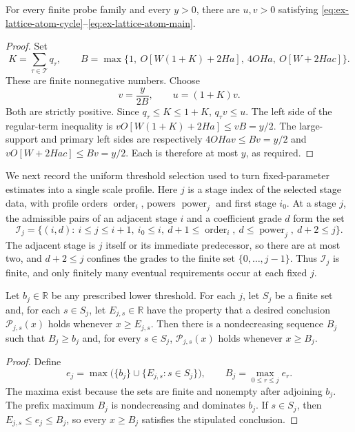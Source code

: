 \begin{lemma}
\label{lem:ex-lattice-local-budget-choice}
For every finite probe family and every \(y>0\), there are \(u,v>0\)
satisfying \eqref{eq:ex-lattice-atom-cycle}--\eqref{eq:ex-lattice-atom-main}.
\end{lemma}
\begin{proof}
Set
\[
 K=\sum_{\tau\in\mathcal T}q_\tau,\qquad
 B=\max\{1,\ O[W(1+K)+2Ha],\ 4OHa,\ O[W+2Hac]\}.
\]
These are finite nonnegative numbers. Choose
\[
 v=\frac{y}{2B},\qquad u=(1+K)v.
\]
Both are strictly positive. Since \(q_\tau\leq K\leq1+K\),
\(q_\tau v\leq u\). The left side of the regular-term inequality is
\(vO[W(1+K)+2Ha]\leq vB=y/2\). The large-support and primary left
sides are respectively \(4OHav\leq Bv=y/2\) and
\(vO[W+2Hac]\leq Bv=y/2\). Each is therefore at most \(y\), as
required.
\end{proof}

We next record the uniform threshold selection used to turn fixed-parameter
estimates into a single scale profile. Here \(j\) is a stage index of the
selected stage data, with profile orders \(\operatorname{order}_i\),
powers \(\operatorname{power}_j\) and first stage \(i_0\). At a stage
\(j\), the admissible pairs of an adjacent stage \(i\) and a coefficient
grade \(d\) form the set
\[
 \mathcal I_j=\bigl\{(i,d):\ i\leq j\leq i+1,\ i_0\leq i,\
   d+1\leq\operatorname{order}_i,\ d\leq\operatorname{power}_j,\
   d+2\leq j\bigr\}.
\]
The adjacent stage is \(j\) itself or its immediate predecessor, so
there are at most two, and \(d+2\leq j\) confines the grades to the finite
set \(\{0,\ldots,j-1\}\). Thus \(\mathcal I_j\) is finite, and only
finitely many eventual requirements
occur at each fixed \(j\).

\begin{lemma}
\label{lem:ex-lattice-monotone-threshold}
Let \(b_j\in\mathbb R\) be any prescribed lower threshold. For each
\(j\), let \(S_j\) be a finite set and, for each \(s\in S_j\), let
\(E_{j,s}\in\mathbb R\) have the property that a desired conclusion
\(\mathcal P_{j,s}(x)\) holds whenever \(x\geq E_{j,s}\). Then there is a
nondecreasing sequence \(B_j\) such that \(B_j\geq b_j\) and, for every
\(s\in S_j\), \(\mathcal P_{j,s}(x)\) holds whenever \(x\geq B_j\).
\end{lemma}
\begin{proof}
Define
\[
 e_j=\max\bigl(\{b_j\}\cup\{E_{j,s}:s\in S_j\}\bigr),
 \qquad B_j=\max_{0\leq r\leq j}e_r.
\]
The maxima exist because the sets are finite and nonempty after adjoining
\(b_j\). The prefix maximum \(B_j\) is nondecreasing and dominates
\(b_j\). If \(s\in S_j\), then \(E_{j,s}\leq e_j\leq B_j\), so every
\(x\geq B_j\) satisfies the stipulated conclusion.
\end{proof}

